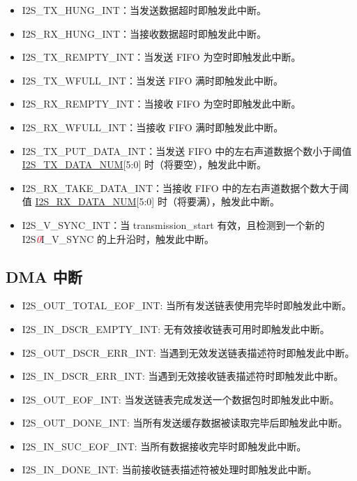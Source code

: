 \documentclass[main\_\_CN.tex]{subfiles}
\begin{document}
\begin{itemize}
\item \label{int:I2STXHUNGINT}I2S\_TX\_HUNG\_INT：当发送数据超时即触发此中断。
\item \label{int:I2SRXHUNGINT}I2S\_RX\_HUNG\_INT：当接收数据超时即触发此中断。
\item \label{int:I2STXREMPTYINT}I2S\_TX\_REMPTY\_INT：当发送 FIFO 为空时即触发此中断。
\item \label{int:I2STXWFULLINT}I2S\_TX\_WFULL\_INT：当发送 FIFO 满时即触发此中断。
\item \label{int:I2SRXREMPTYINT}I2S\_RX\_REMPTY\_INT：当接收 FIFO 为空时即触发此中断。
\item \label{int:I2SRXWFULLINT}I2S\_RX\_WFULL\_INT：当接收 FIFO 满时即触发此中断。
\item \label{int:I2STXPUTDATAINT}I2S\_TX\_PUT\_DATA\_INT：当发送 FIFO 中的左右声道数据个数小于阈值 \hyperref[fielddesc:I2STXDATANUM]{I2S\_TX\_DATA\_NUM}[5:0] 时（将要空），触发此中断。
\item \label{int:I2SRXTAKEDATAINT}I2S\_RX\_TAKE\_DATA\_INT：当接收 FIFO 中的左右声道数据个数大于阈值 \hyperref[fielddesc:I2SRXDATANUM]{I2S\_RX\_DATA\_NUM}[5:0] 时（将要满），触发此中断。
\item \label{int:I2SVSYNCINT}I2S\_V\_SYNC\_INT：当 transmission\_start 有效，且检测到一个新的 I2S\textcolor{red}{\it{0}}I\_V\_SYNC 的上升沿时，触发此中断。
\end{itemize}

\subsection{DMA 中断}\label{section:DMA interrupts}
\begin{itemize}
\item \label{int:I2SOUTTOTALEOFINT}I2S\_OUT\_TOTAL\_EOF\_INT: 当所有发送链表使用完毕时即触发此中断。
\item \label{int:I2SINDSCREMPTYINT}I2S\_IN\_DSCR\_EMPTY\_INT: 无有效接收链表可用时即触发此中断。
\item \label{int:I2SOUTDSCRERRINT}I2S\_OUT\_DSCR\_ERR\_INT: 当遇到无效发送链表描述符时即触发此中断。
\item \label{int:I2SINDSCRERRINT}I2S\_IN\_DSCR\_ERR\_INT: 当遇到无效接收链表描述符时即触发此中断。
\item \label{int:I2SOUTEOFINT}I2S\_OUT\_EOF\_INT: 当发送链表完成发送一个数据包时即触发此中断。
\item \label{int:I2SOUTDONEINT}I2S\_OUT\_DONE\_INT: 当所有发送缓存数据被读取完毕后即触发此中断。
\item \label{int:I2SINSUCEOFINT}I2S\_IN\_SUC\_EOF\_INT: 当所有数据接收完毕时即触发此中断。
\item \label{int:I2SINDONEINT}I2S\_IN\_DONE\_INT: 当前接收链表描述符被处理时即触发此中断。
\end{itemize}
\end{document}
